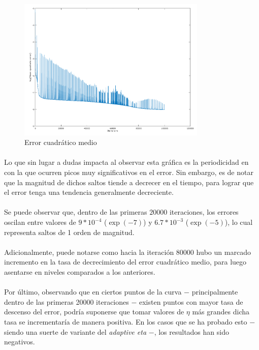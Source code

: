\documentclass[12pt, twocolumn]{article}
\begin{document}
	\begin{figure}[H]
		\centering
		\includegraphics[width=9cm]{../results/batch_momentum/2/log_batch.png}
		\caption{Error cuadrático medio}
		\label{error2}
	\end{figure}
	
	\paragraph{} Lo que sin lugar a dudas impacta al observar esta gráfica es la periodicidad en con la que ocurren picos muy significativos en el error. Sin embargo, es de notar que la magnitud de dichos saltos tiende a decrecer en el tiempo, para lograr que el error tenga una tendencia generalmente decreciente. 
	
	\paragraph{} Se puede observar que, dentro de las primeras $20000$ iteraciones, los errores oscilan entre valores de $9*10^{-4}$ ($\exp(-7)$) y $6.7*10^{-3}$ ($\exp(-5)$), lo cual representa saltos de 1 orden de magnitud. 
	
	\paragraph{} Adicionalmente, puede notarse como hacia la iteración 80000 hubo un marcado incremento en la tasa de decrecimiento del error cuadrático medio, para luego asentarse en niveles comparados a los anteriores. 
	
	\paragraph{} Por último, observando que en ciertos puntos de la curva $-$ principalmente dentro de las primeras 20000 iteraciones $-$ existen puntos con mayor tasa de descenso del error, podría suponerse que tomar valores de $\eta$ más grandes dicha tasa se incrementaría de manera positiva. En los casos que se ha probado esto $-$ siendo una suerte de variante del \textit{adaptive eta} $-$, los resultados han sido negativos.  
	
\end{document}
